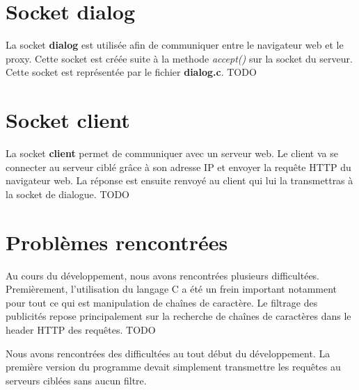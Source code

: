 \documentclass[a4paper,11pt, oneside]{book}
\def\todo{{\color{red}\Huge{TODO}}}
\begin{document}
		\section{Socket dialog}

			La socket \textbf{dialog} est utilisée afin de communiquer entre le navigateur web et le proxy. Cette socket est créée
			suite à la methode \textit{accept()} sur la socket du serveur. Cette socket est représentée par le fichier \textbf{dialog.c}.
			\todo

		\section{Socket client}

			La socket \textbf{client} permet de communiquer avec un serveur web. Le client va se connecter au serveur ciblé grâce à son adresse IP
			et envoyer la requête HTTP du navigateur web. La réponse est ensuite renvoyé au client qui lui la transmettras à la socket de dialogue.
			\todo

		\section{Problèmes rencontrées}

			Au cours du développement, nous avons rencontrées plusieurs difficultées.
			Premièrement, l'utilisation du langage C a été un frein important notamment pour tout ce qui est
			manipulation de chaînes de caractère.
			Le filtrage des publicités repose principalement sur la recherche de chaînes de caractères dans le header HTTP des requêtes.
			\todo


			Nous avons rencontrées des difficultées au tout début du développement. La première version du programme devait simplement transmettre
			les requêtes au serveurs ciblées sans aucun filtre.
\end{document}
